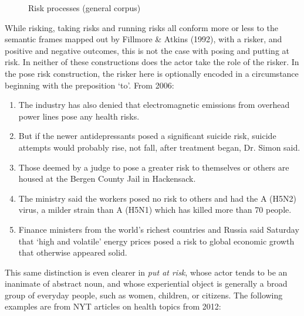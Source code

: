 \begin{figure}[htb!]
\centering
{}
\caption{Risk processes (general corpus)}
\label{fig:pcs}
\end{figure}

While risking, taking risks and running risks all conform more or less to the semantic frames mapped out by Fillmore \& Atkins (1992), with a risker, and positive and negative outcomes, this is not the case with posing and putting at risk. In neither of these constructions does the actor take the role of the risker. In the pose risk construction, the risker here is optionally encoded in a circumstance beginning with the preposition `to'. From 2006:
%
\begin{enumerate} [before=\color{black}\ttfamily] \setlength\itemsep{0em} \small
\item The industry has also denied that electromagnetic emissions from overhead power lines pose any health risks.
\item But if the newer antidepressants posed a significant suicide risk, suicide attempts would probably rise, not fall, after treatment began, Dr. Simon said.
\item Those deemed by a judge to pose a greater risk to themselves or others are housed at the Bergen County Jail in Hackensack.
\item The ministry said the workers posed no risk to others and had the A (H5N2) virus, a milder strain than A (H5N1) which has killed more than 70 people.
\item Finance ministers from the world's richest countries and Russia said Saturday that `high and volatile' energy prices posed a risk to global economic growth that otherwise appeared solid.
\end{enumerate}
%
This same distinction is even clearer in \emph{put at risk}, whose actor tends to be an inanimate of abstract noun, and whose experiential object is generally a broad group of everyday people, such as women, children, or citizens. The following examples are from NYT articles on health topics from 2012:
